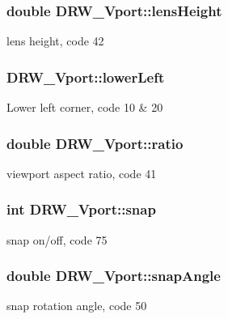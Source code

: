 \subsubsection[{lens\+Height}]{\setlength{\rightskip}{0pt plus 5cm}double D\+R\+W\+\_\+\+Vport\+::lens\+Height}\label{class_d_r_w___vport_a9d3e2b640f9f9791d50b00f5cae452f9}
lens height, code 42 \hypertarget{class_d_r_w___vport_a27df49d3aacabe83be11ac29463f75c1}{}
\subsubsection[{lower\+Left}]{ D\+R\+W\+\_\+\+Vport\+::lower\+Left}\label{class_d_r_w___vport_a27df49d3aacabe83be11ac29463f75c1}
Lower left corner, code 10 \& 20 \hypertarget{class_d_r_w___vport_ab84331826a4e1bd181eb2ca6a55e4a97}{}
\subsubsection[{ratio}]{\setlength{\rightskip}{0pt plus 5cm}double D\+R\+W\+\_\+\+Vport\+::ratio}\label{class_d_r_w___vport_ab84331826a4e1bd181eb2ca6a55e4a97}
viewport aspect ratio, code 41 \hypertarget{class_d_r_w___vport_a9a358c56a549eba62bb326fdcc510bb2}{}
\subsubsection[{snap}]{\setlength{\rightskip}{0pt plus 5cm}int D\+R\+W\+\_\+\+Vport\+::snap}\label{class_d_r_w___vport_a9a358c56a549eba62bb326fdcc510bb2}
snap on/off, code 75 \hypertarget{class_d_r_w___vport_a1709ba5680cf5b0bf9c7b41bab479225}{}
\subsubsection[{snap\+Angle}]{\setlength{\rightskip}{0pt plus 5cm}double D\+R\+W\+\_\+\+Vport\+::snap\+Angle}\label{class_d_r_w___vport_a1709ba5680cf5b0bf9c7b41bab479225}
snap rotation angle, code 50 \hypertarget{class_d_r_w___vport_a152be2cc28b499c29e9302efa54e001c}{}
